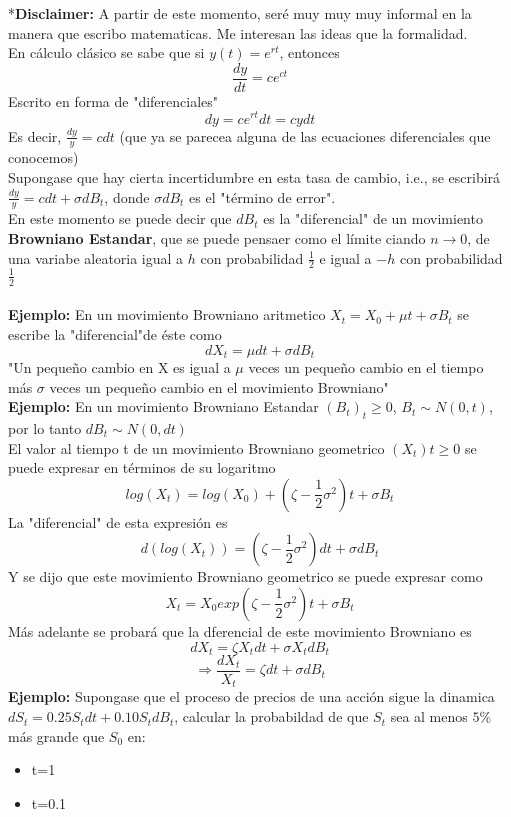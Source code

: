 \documentclass[12pts]{extarticle}
\begin{document}
*\textbf{Disclaimer:} A partir de este momento, seré muy muy muy informal en la manera que escribo matematicas. Me interesan las ideas que la formalidad. 
\\
En cálculo clásico se sabe que si $y(t)=e^{rt}$, entonces $$\frac{dy}{dt}=ce^{ct}$$
Escrito en forma de "diferenciales"
$$dy=ce^{rt}dt=cydt$$
Es decir, $\frac{dy}{y}=cdt$ (que ya se parecea alguna de las ecuaciones diferenciales que conocemos) \\
Supongase que hay cierta incertidumbre en esta tasa de cambio, i.e., se escribirá $\frac{dy}{y}=cdt+\sigma dB_t$, donde $\sigma dB_t$ es el "término de error".
\\
En este momento se puede decir que $dB_t$ es la "diferencial" de un movimiento \textbf{Browniano Estandar}, que se puede pensaer como el límite ciando $n\rightarrow 0$, de una variabe aleatoria igual a $h$ con probabilidad $\frac{1}{2}$ e igual a $-h$ con probabilidad $\frac{1}{2}$ \\\\
\textbf{Ejemplo:} En un movimiento Browniano aritmetico $X_t=X_0+\mu t+\sigma B_t$ se escribe la "diferencial"de éste como $$dX_t=\mu dt+\sigma dB_t$$
"Un pequeño cambio en X es igual a $\mu$ veces un pequeño cambio en el tiempo más $\sigma$ veces un pequeño cambio en el movimiento Browniano" 
\\ 
\textbf{Ejemplo:} En un movimiento Browniano Estandar $(B_t)_t\geq0$, $B_t \sim N(0, t)$, por lo tanto $dB_t\sim N(0, dt)$ \\
El valor al tiempo t de un movimiento Browniano geometrico $(X_t)t\geq0$ se puede expresar en términos de su logaritmo 
$$log(X_t)=log(X_0)+(\zeta -\frac{1}{2}\sigma^2)t + \sigma B_t$$ 
La "diferencial" de esta expresión es 
$$ d(log(X_t))=(\zeta -\frac{1}{2}\sigma^2)dt+\sigma dB_t$$ 
Y se dijo que este movimiento Browniano geometrico se puede expresar como $$ X_t=X_0 exp{(\zeta -\frac{1}{2}\sigma^2)t+\sigma B_t}$$
Más adelante se probará que la dferencial de este movimiento Browniano es $$dX_t=\zeta X_t dt + \sigma X_t dB_t$$
$$\Rightarrow \frac{dX_t}{X_t}=\zeta dt +\sigma dB_t$$ 
\textbf{Ejemplo:} Supongase que el proceso de precios de una acción sigue la dinamica $dS_t=0.25S_t dt+0.10S_tdB_t$, calcular la probabildad de que $S_t$ sea al menos $5\%$ más grande que $S_0$ en: 
\begin{itemize}
\item t=1
\item t=0.1
\end{itemize}
\end{document}
